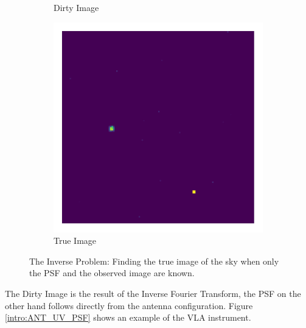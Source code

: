 \begin{figure}[h!]
\begin{subfigure}[b]{0.3\linewidth}
		\caption{Dirty Image}
	\end{subfigure}
	\begin{subfigure}[b]{0.3\linewidth}
		\includegraphics[width=\linewidth, trim={18px 19px 18px 18px}, clip]{./chapters/01.intro/img/true_image.png}
		\caption{True Image}
	\end{subfigure}
	\caption{The Inverse Problem: Finding the true image of the sky when only the PSF and the observed image are known.}
	\label{intro:inverse_problem}
\end{figure}

The Dirty Image is the result of the Inverse Fourier Transform, the PSF on the other hand follows directly from the antenna configuration. Figure \ref{intro:ANT_UV_PSF} shows an example of the VLA instrument. 

